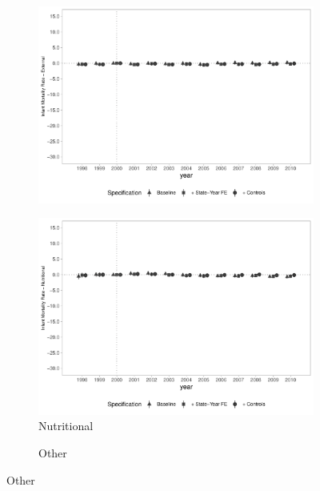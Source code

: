 \begin{figure}[h]
\begin{center}
\begin{subfigure}{0.32\textwidth}
        \includegraphics[width=\textwidth]{plots/IMR/tx_mi_ext_dist_ec29_baseline_dist_ec29_baseline_full.pdf}
    \end{subfigure}
        \begin{subfigure}{0.32\textwidth}
        \centering
        \caption{\scriptsize Nutritional}\label{fig:imr3_f}
        \includegraphics[width=\textwidth]{plots/IMR/tx_mi_nut_dist_ec29_baseline_dist_ec29_baseline_full.pdf}
    \end{subfigure}
        \begin{subfigure}{0.32\textwidth}
        \centering
        \caption{\scriptsize Other}\label{fig:imr3_g}

\end{subfigure}
\end{center}
\end{figure}
